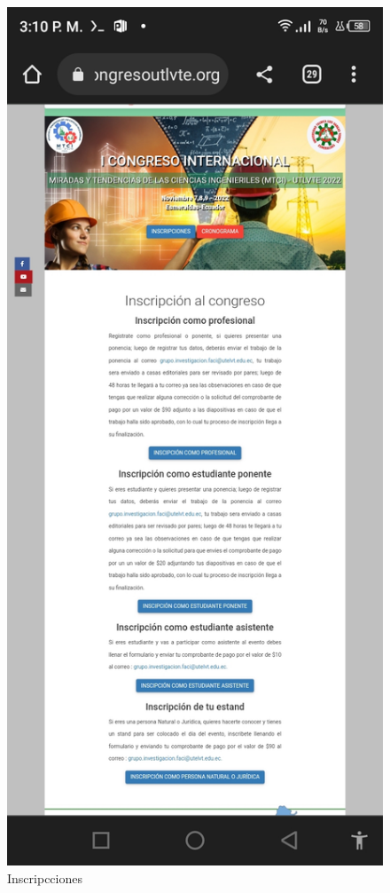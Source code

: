 \documentclass[a4paper,14px]{article}
\begin{document}
\begin{figure}[H]
  \centering
  \includegraphics[scale=0.3]{inscripcion.jpg}
  \caption{Inscripcciones}
  \label{fig:arquitectura}
\end{figure}
\end{document}
